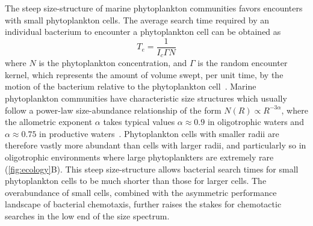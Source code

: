 \documentclass[9pt,twocolumn,twoside]{pnas-new}
\begin{document}
The steep size-structure of marine phytoplankton communities favors encounters with small phytoplankton cells.
The average search time required by an individual bacterium to encounter a phytoplankton cell can be obtained as
\begin{equation}\label{eq:search_time}
    T_e = \dfrac{1}{I_c \Gamma N}
\end{equation}
where $N$ is the phytoplankton concentration, and $\Gamma$ is the random encounter kernel, which represents the amount of volume swept, per unit time, by the motion of the bacterium relative to the phytoplankton cell~\cite{kiorboe2008mechanistic,slomka2023encounter}.
Marine phytoplankton communities have characteristic size structures which usually follow a power-law size-abundance relationship of the form $N(R) \propto R^{-3\alpha}$, where the allometric exponent $\alpha$ takes typical values $\alpha\approx0.9$ in oligotrophic waters and $\alpha\approx0.75$ in productive waters~\cite{cermeno2008species}.
Phytoplankton cells with smaller radii are therefore vastly more abundant than cells with larger radii, and particularly so in oligotrophic environments where large phytoplankters are extremely rare (\autoref{fig:ecology}B).
This steep size-structure allows bacterial search times for small phytoplankton cells to be much shorter than those for larger cells.
The overabundance of small cells, combined with the asymmetric performance landscape of bacterial chemotaxis, further raises the stakes for chemotactic searches in the low end of the size spectrum.
\end{document}
